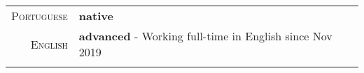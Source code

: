 %
%
%

\begin{tabular}{rl}
    \textsc{Portuguese} & \textbf{native} \\
    \textsc{English} & \textbf{advanced} - Working full-time in English since Nov 2019  \\ \\
\end{tabular}
